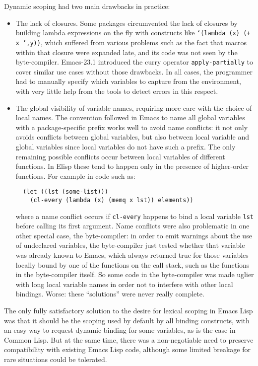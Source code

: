 \documentclass[format=acmsmall, review]{acmart}
\newcommand \Elisp {Emacs Lisp}
\begin{document}
Dynamic scoping had two main drawbacks in practice:
\begin{itemize}
\item The lack of closures.
  Some packages circumvented the lack of closures
  by building lambda expressions on the fly with constructs like
  \texttt{`(lambda (x) (+ x ',y))}, which suffered from various problems
  such as the fact that macros within that closure were expanded late, and
  its code was not seen by the byte-compiler.  Emacs-23.1 introduced the
  curry operator \texttt{apply-partially} to cover similar use cases without
  those drawbacks.  In all cases, the programmer had to manually specify
  which variables to capture from the environment, with very little help
  from the tools to detect errors in this respect.
\item The global visibility of variable names, requiring more care with the
  choice of local names.  The convention followed in Emacs to name all
  global variables with a package-specific prefix works well to avoid name
  conflicts: it not only avoids conflicts between global variables, but also
  between local variable and global variables since local variables do not
  have such a prefix.  The only remaining possible conflicts occur between
  local variables of different functions.  In Elisp these tend to happen only
  in the presence of higher-order functions.  For example in code such as:
\begin{verbatim}
  (let ((lst (some-list)))
    (cl-every (lambda (x) (memq x lst)) elements))
\end{verbatim}
  where a name conflict occurs if \texttt{cl-every} happens to bind a local
  variable \texttt{lst} before calling its first argument.  Name conflicts
  were also problematic in one other special case, the byte-compiler: in
  order to emit warnings about the use of undeclared variables, the
  byte-compiler just tested whether that variable was already known to
  Emacs, which always returned true for those variables locally bound by one
  of the functions on the call stack, such as the functions in the
  byte-compiler itself.  So some code in the byte-compiler was made uglier
  with long local variable names in order not to interfere with other local
  bindings.  Worse: these ``solutions'' were never really complete.
\end{itemize}
The only fully satisfactory solution to the desire for lexical scoping in
\Elisp{} was that it should be the scoping used by default by all binding
constructs, with an easy way to request dynamic binding for some
variables, as is the case in Common Lisp.  But at the same time, there was
a non-negotiable need to preserve compatibility with existing \Elisp{} code,
although some limited breakage for rare situations could be tolerated.
\end{document}
